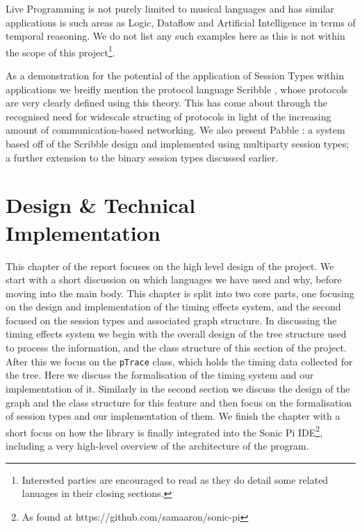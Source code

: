 \documentclass[11pt, abstracton, twoside, titlepage=true]{scrartcl}
\begin{document}
Live Programming is not purely limited to musical languages and has similar 
applications is such areas as Logic, Dataflow and Artificial Intelligence in
terms of temporal reasoning. We do not list any such examples here as this is
not within the scope of this project\footnote{Interested parties are encouraged
to read \cite{AOB14} as they do detail some related lanuages in their closing 
sections.}.

As a demonstration for the potential of the application of Session Types 
within applications we breifly mention the protocol language Scribble 
\cite{HMBCY11}, whose protocols are very clearly defined using this theory. 
This has come about through the recognised need for widescale structing of 
protocols in light of the increasing amount of communication-based networking. 
We also present Pabble \cite{NY14}: a system based off of the Scribble design 
and implemented using multiparty session types; a further extension to the 
binary session types discussed earlier.
\newpage

\section{Design \& Technical Implementation}
\thispagestyle{empty}
This chapter of the report focuses on the high level design of the project.
We start with a short discussion on which languages we have used and why, before
moving into the main body. This chapter is split into two core parts, one 
focusing on the design and implementation of the timing effects system, and
the second focused on the session types and associated graph structure. In 
discussing the timing effects system we begin with the overall design of the tree
structure used to process the information, and the class structure of this section
of the project. After this we focus on the \texttt{pTrace} class, which holds
the timing data collected for the tree. Here we discuss the formalisation of the
timing system and our implementation of it. Similarly in the second section we
discuss the design of the graph and the class structure for this feature and then
focus on the formalisation of session types and our implementation of them. We 
finish the chapter with a short focus on how the library is finally integrated
into the Sonic Pi IDE\footnote{As found at https://github.com/samaaron/sonic-pi}, 
including a very high-level overview of the architecture of the program.
\end{document}
